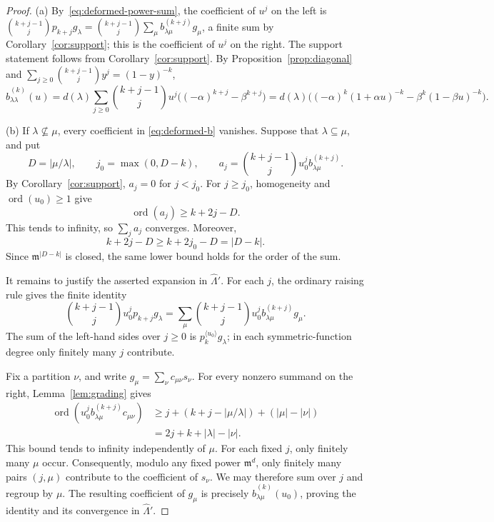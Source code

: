 \documentclass[11pt]{amsart}
\numberwithin{equation}{section}
\theoremstyle{definition}
\theoremstyle{remark}
\newcommand{\hLam}{\widehat\Lambda}
\begin{document}
\begin{proof}
(a) By~\eqref{eq:deformed-power-sum}, the coefficient of $u^j$ on the left
is $\binom{k+j-1}{j}p_{k+j}g_\lambda
=\binom{k+j-1}{j}\sum_\mu b^{(k+j)}_{\lambda\mu}g_\mu$, a finite sum by
Corollary~\ref{cor:support}; this is the coefficient of $u^j$ on the right.
The support statement follows from Corollary~\ref{cor:support}. By
Proposition~\ref{prop:diagonal} and
$\sum_{j\geq0}\binom{k+j-1}{j}y^j=(1-y)^{-k}$,
\[
 \widehat b^{(k)}_{\lambda\lambda}(u)
 =d(\lambda)\sum_{j\geq0}\binom{k+j-1}{j}u^j\bigl((-\alpha)^{k+j}-\beta^{k+j}\bigr)
 =d(\lambda)\bigl((-\alpha)^k(1+\alpha u)^{-k}-\beta^k(1-\beta u)^{-k}\bigr).
\]

(b) If $\lambda\not\subseteq\mu$, every coefficient in
\eqref{eq:deformed-b} vanishes. Suppose that
$\lambda\subseteq\mu$, and put
\[
 D=|\mu/\lambda|,\qquad
 j_0=\max(0,D-k),\qquad
 a_j=\binom{k+j-1}{j}u_0^j b^{(k+j)}_{\lambda\mu}.
\]
By Corollary~\ref{cor:support}, $a_j=0$ for $j<j_0$.
For $j\geq j_0$, homogeneity and
$\operatorname{ord}(u_0)\geq1$ give
\[
 \operatorname{ord}(a_j)\geq k+2j-D.
\]
This tends to infinity, so $\sum_j a_j$ converges.
Moreover,
\[
 k+2j-D\geq k+2j_0-D=|D-k|.
\]
Since $\mathfrak m^{|D-k|}$ is closed, the same lower bound
holds for the order of the sum.

It remains to justify the asserted expansion in $\hLam'$.
For each $j$, the ordinary raising rule gives the finite
identity
\[
 \binom{k+j-1}{j}u_0^j p_{k+j}g_\lambda
 =\sum_{\mu}
   \binom{k+j-1}{j}u_0^j
   b^{(k+j)}_{\lambda\mu}g_\mu.
\]
The sum of the left-hand sides over $j\geq0$ is
$p_k^{\langle u_0\rangle}g_\lambda$; in each symmetric-function
degree only finitely many $j$ contribute.

Fix a partition $\nu$, and write
$g_\mu=\sum_\nu c_{\mu\nu}s_\nu$. For every nonzero
summand on the right, Lemma~\ref{lem:grading} gives
\begin{align*}
 \operatorname{ord}\!\left(
   u_0^j b^{(k+j)}_{\lambda\mu}c_{\mu\nu}
 \right)
 &\geq j+(k+j-|\mu/\lambda|)+(|\mu|-|\nu|)\\
 &=2j+k+|\lambda|-|\nu|.
\end{align*}
This bound tends to infinity independently of $\mu$.
For each fixed $j$, only finitely many $\mu$ occur.
Consequently, modulo any fixed power $\mathfrak m^d$, only
finitely many pairs $(j,\mu)$ contribute to the coefficient
of $s_\nu$. We may therefore sum over $j$ and regroup by
$\mu$. The resulting coefficient of $g_\mu$ is precisely
$\widehat b^{(k)}_{\lambda\mu}(u_0)$, proving the identity
and its convergence in $\hLam'$.
\end{proof}
\end{document}
